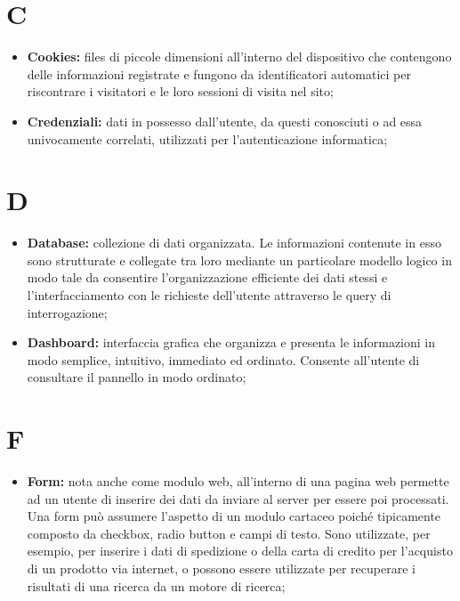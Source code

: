 	\section*{\Huge C} %
		\begin{itemize}
			\item \textbf{Cookies:} files di piccole dimensioni all'interno del dispositivo che contengono delle informazioni registrate e fungono da identificatori automatici per riscontrare i visitatori e le loro sessioni di visita nel sito;
			\item \textbf{Credenziali:} dati in possesso dall'utente, da questi conosciuti o ad essa univocamente correlati, utilizzati per l'autenticazione informatica;
		\end{itemize}


	\section*{\Huge D} %
		\begin{itemize}
			\item \textbf{Database:} collezione di dati organizzata. Le informazioni contenute in esso sono strutturate e collegate tra loro mediante un particolare modello logico in modo tale da consentire l'organizzazione efficiente dei dati stessi e l'interfacciamento con le richieste dell'utente attraverso le query di interrogazione;
			\item \textbf{Dashboard:} interfaccia grafica che organizza e presenta le informazioni in modo semplice, intuitivo, immediato ed ordinato. Consente all'utente di consultare il pannello in modo ordinato;
		\end{itemize}


	\section*{\Huge F} %
		\begin{itemize}
			\item \textbf{Form:} nota anche come modulo web, all'interno di una pagina web permette ad un utente di inserire dei dati da inviare al server per essere poi processati. Una form può assumere l'aspetto di un modulo cartaceo poiché tipicamente composto da checkbox, radio button e campi di testo. Sono utilizzate, per esempio, per inserire i dati di spedizione o della carta di credito per l'acquisto di un prodotto via internet, o possono essere utilizzate per recuperare i risultati di una ricerca da un motore di ricerca;
		\end{itemize}


